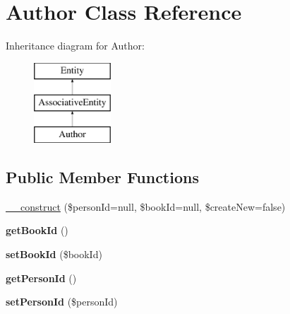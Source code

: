 \hypertarget{classAuthor}{
\section{Author Class Reference}
\label{classAuthor}
}
Inheritance diagram for Author:\begin{figure}[H]
\begin{center}
\leavevmode
\includegraphics[height=3.000000cm]{classAuthor}
\end{center}
\end{figure}
\subsection*{Public Member Functions}
\begin{DoxyCompactItemize}
\item 
\hyperlink{classAuthor_ad0dc0fef1570b45b600c990053adeb36}{\_\-\_\-construct} (\$personId=null, \$bookId=null, \$createNew=false)
\item 
\hypertarget{classAuthor_a5f4d6e520feb52f072417b1ae445eabc}{
{\bfseries getBookId} ()}
\label{classAuthor_a5f4d6e520feb52f072417b1ae445eabc}

\item 
\hypertarget{classAuthor_af40db8767cf8f9ad7d30e9d5191e9f28}{
{\bfseries setBookId} (\$bookId)}
\label{classAuthor_af40db8767cf8f9ad7d30e9d5191e9f28}

\item 
\hypertarget{classAuthor_ae2af2c34ad093a8f53e9171f07c7323d}{
{\bfseries getPersonId} ()}
\label{classAuthor_ae2af2c34ad093a8f53e9171f07c7323d}

\item 
\hypertarget{classAuthor_a39f0c9e0946425c62dba102e2aaacebc}{
{\bfseries setPersonId} (\$personId)}
\label{classAuthor_a39f0c9e0946425c62dba102e2aaacebc}

\end{DoxyCompactItemize}

